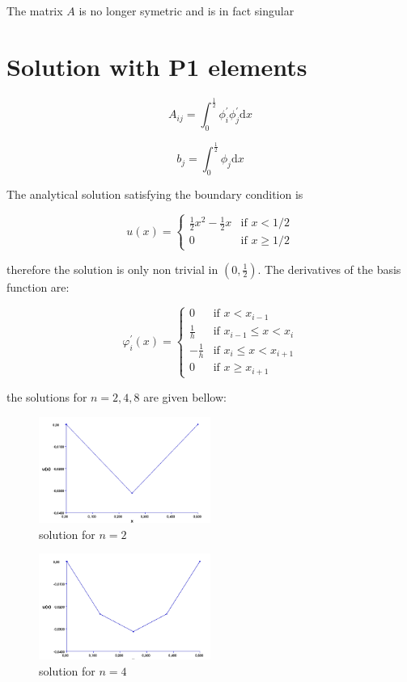 \documentclass[10pt,a4paper]{report}
\begin{document}
The matrix $A$ is no longer symetric and is in fact singular

\section{Solution with P1 elements}
\begin{equation}
A_{ij} = \int_{0}^{\frac{1}{2}}\phi_{i}^{\prime}\phi_{j}^{\prime}\mathrm{d}x \nonumber
\end{equation}

\begin{equation}
b_{j} = \int_{0}^{\frac{1}{2}}\phi_{j}\mathrm{d}x\nonumber
\end{equation}

The analytical solution satisfying the boundary condition is  


\[
 u(x) =
  \begin{cases}
   \frac{1}{2}x^{2}-\frac{1}{2}x & \text{if } x < 1/2 \\
   0       & \text{if } x \ge 1/2
  \end{cases}
\]

therefore the solution is only non trivial in $(0,\frac{1}{2})$. The derivatives of the basis function are: 

\[
 \varphi_{i}^{\prime}(x) =
  \begin{cases}
   0 & \text{if } x < x_{i-1} \\
   \frac{1}{h}       & \text{if } x_{i-1} \leq  x < x_{i}\\
   -\frac{1}{h}      & \text{if } x_{i} \leq  x < x_{i+1}\\
   0     & \text{if }   x \ge x_{i+1}
  \end{cases}
\]

the solutions for $n=2,4,8$ are given bellow:

\begin{figure}[H]
  \caption{solution for $n= 2$}
  \centering
    \includegraphics[width=0.5\textwidth]{n2.png}
\end{figure}

\begin{figure}[H]
  \caption{solution for $n= 4$}
  \centering
    \includegraphics[width=0.5\textwidth]{n4.png}
\end{figure}
\end{document}

